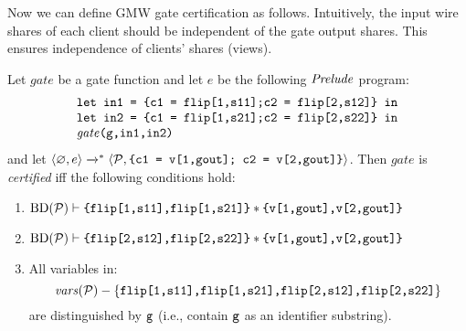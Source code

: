 Now we can define GMW gate certification as follows. Intuitively, the
input wire shares of each client should be independent of the gate output
shares. This ensures independence of clients' shares (views).
\begin{definition}
  \label{definition-gmwgate-certification}
  Let $\mathit{gate}$ be a gate function and let $e$ be the following
  $\mathit{Prelude}$ program:
  $$
  \begin{array}{l}
    \texttt{let in1 = \{c1 = flip[1,s11];c2 = flip[2,s12]\} in}\\
    \texttt{let in2 = \{c1 = flip[1,s21];c2 = flip[2,s22]\} in}\\
    \mathit{gate}\texttt{(g,in1,in2)}
  \end{array}
  $$
  and let $
  \langle \varnothing,e \rangle\xrightarrow{}^{*}\langle \mathcal{P},\texttt{\{c1 = v[1,gout]; c2 = v[2,gout]\}} \rangle
  $.
  Then $\mathit{gate}$ is \emph{certified} iff the following conditions hold:
  \begin{enumerate}[\hspace{5mm}i.]
  \item $\mathrm{BD}(\mathcal{P}) \vdash \texttt{\{flip[1,s11],flip[1,s21]\}} * \texttt{\{v[1,gout],v[2,gout]\}}$
  \item $\mathrm{BD}(\mathcal{P}) \vdash \texttt{\{flip[2,s12],flip[2,s22]\}} * \texttt{\{v[1,gout],v[2,gout]\}}$
  \item All variables in:$$\mathit{vars}(\mathcal{P}) - \{ \texttt{flip[1,s11],flip[1,s21],flip[2,s12],flip[2,s22]}\}$$
    are distinguished by $\texttt{g}$ (i.e., contain $\texttt{g}$ as an identifier substring). 
  \end{enumerate}
\end{definition}

